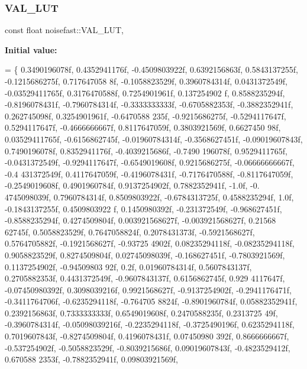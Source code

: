 \subsubsection{\texorpdfstring{V\+A\+L\+\_\+\+L\+UT}{VAL\_LUT}}
{\footnotesize\ttfamily const float noisefast\+::\+V\+A\+L\+\_\+\+L\+UT\hspace{0.3cm}{\ttfamily [static]}, {\ttfamily [private]}}

{\bfseries Initial value\+:}
\begin{DoxyCode}
=
\{
    0.3490196078f, 0.4352941176f, -0.4509803922f, 0.6392156863f, 0.5843137255f, -0.1215686275f, 0.717647058
      8f, -0.1058823529f, 0.3960784314f, 0.0431372549f, -0.03529411765f, 0.3176470588f, 0.7254901961f, 0.137254902
      f, 0.8588235294f, -0.8196078431f,
    -0.7960784314f, -0.3333333333f, -0.6705882353f, -0.3882352941f, 0.262745098f, 0.3254901961f, -0.6470588
      235f, -0.9215686275f, -0.5294117647f, 0.5294117647f, -0.4666666667f, 0.8117647059f, 0.3803921569f, 0.6627450
      98f, 0.03529411765f, -0.6156862745f,
    -0.01960784314f, -0.3568627451f, -0.09019607843f, 0.7490196078f, 0.8352941176f, -0.4039215686f, -0.7490
      196078f, 0.9529411765f, -0.0431372549f, -0.9294117647f, -0.6549019608f, 0.9215686275f, -0.06666666667f, -0.4
      431372549f, 0.4117647059f, -0.4196078431f,
    -0.7176470588f, -0.8117647059f, -0.2549019608f, 0.4901960784f, 0.9137254902f, 0.7882352941f, -1.0f, -0.
      4745098039f, 0.7960784314f, 0.8509803922f, -0.6784313725f, 0.4588235294f, 1.0f, -0.1843137255f, 0.4509803922
      f, 0.1450980392f,
    -0.231372549f, -0.968627451f, -0.8588235294f, 0.4274509804f, 0.003921568627f, -0.003921568627f, 0.21568
      62745f, 0.5058823529f, 0.7647058824f, 0.2078431373f, -0.5921568627f, 0.5764705882f, -0.1921568627f, -0.93725
      4902f, 0.08235294118f, -0.08235294118f,
    0.9058823529f, 0.8274509804f, 0.02745098039f, -0.168627451f, -0.7803921569f, 0.1137254902f, -0.94509803
      92f, 0.2f, 0.01960784314f, 0.5607843137f, 0.2705882353f, 0.4431372549f, -0.9607843137f, 0.6156862745f, 0.929
      4117647f, -0.07450980392f,
    0.3098039216f, 0.9921568627f, -0.9137254902f, -0.2941176471f, -0.3411764706f, -0.6235294118f, -0.764705
      8824f, -0.8901960784f, 0.05882352941f, 0.2392156863f, 0.7333333333f, 0.6549019608f, 0.2470588235f, 0.2313725
      49f, -0.3960784314f, -0.05098039216f,
    -0.2235294118f, -0.3725490196f, 0.6235294118f, 0.7019607843f, -0.8274509804f, 0.4196078431f, 0.07450980
      392f, 0.8666666667f, -0.537254902f, -0.5058823529f, -0.8039215686f, 0.09019607843f, -0.4823529412f, 0.670588
      2353f, -0.7882352941f, 0.09803921569f,

\end{DoxyCode}
